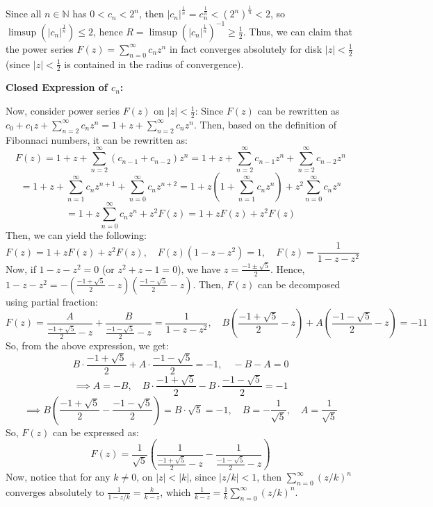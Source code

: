\documentclass{article}
\begin{document}
Since all $n\in\mathbb{N}$ has $0<c_n<2^n$, then $|c_n|^{\frac{1}{n}}=c_n^{\frac{1}{n}}<(2^n)^{\frac{1}{n}}<2$, so $\limsup(|c_n|^{\frac{1}{n}})\leq 2$, hence $R=\limsup(|c_n|^{\frac{1}{n}})^{-1}\geq\frac{1}{2}$.
Thus, we can claim that the power series $F(z)=\sum_{n=0}^{\infty}c_nz^n$ in fact converges absolutely for disk $|z|<\frac{1}{2}$ (since $|z|<\frac{1}{2}$ is contained in the radius of convergence).

\hfil

\textbf{Closed Expression of $c_n$:}

Now, consider power series $F(z)$ on $|z|<\frac{1}{2}$: Since $F(z)$ can be rewritten as $c_0+c_1z+\sum_{n=2}^{\infty}c_nz^n = 1+z+\sum_{n=2}^{\infty}c_nz^n$.
Then, based on the definition of Fibonnaci numbers, it can be rewritten as:
$$F(z)=1+z+\sum_{n=2}^{\infty}(c_{n-1}+c_{n-2})z^n = 1+z+\sum_{n=2}^{\infty}c_{n-1}z^n+\sum_{n=2}^{\infty}c_{n-2}z^n$$
$$ = 1+z+\sum_{n=1}^{\infty}c_nz^{n+1}+\sum_{n=0}^{\infty}c_nz^{n+2} = 1+z\left(1+\sum_{n=1}^{\infty}c_nz^n\right)+z^2\sum_{n=0}^{\infty}c_nz^n$$
$$=1+z\sum_{n=0}^{\infty}c_nz^n+z^2F(z) = 1+zF(z)+z^2F(z)$$
Then, we can yield the following:
$$F(z)=1+zF(z)+z^2F(z),\quad F(z)(1-z-z^2)=1,\quad F(z)=\frac{1}{1-z-z^2}$$
Now, if $1-z-z^2=0$ (or $z^2+z-1=0$), we have $z=\frac{-1\pm\sqrt{5}}{2}$. Hence, $1-z-z^2=-\left(\frac{-1+\sqrt{5}}{2}-z\right)\left(\frac{-1-\sqrt{5}}{2}-z\right)$.
Then, $F(z)$ can be decomposed using partial fraction:
$$F(z)=\frac{A}{\frac{-1+\sqrt{5}}{2}-z}+\frac{B}{\frac{-1-\sqrt{5}}{2}-z}=\frac{1}{1-z-z^2},\quad B\left(\frac{-1+\sqrt{5}}{2}-z\right)+A\left(\frac{-1-\sqrt{5}}{2}-z\right)=-11$$
So, from the above expression, we get:
$$B\cdot\frac{-1+\sqrt{5}}{2}+A\cdot \frac{-1-\sqrt{5}}{2}=-1,\quad -B-A=0$$
$$\implies A=-B,\quad B\cdot\frac{-1+\sqrt{5}}{2}-B\cdot \frac{-1-\sqrt{5}}{2}=-1$$
$$\implies B\left(\frac{-1+\sqrt{5}}{2}-\frac{-1-\sqrt{5}}{2}\right)=B\cdot \sqrt{5}=-1,\quad B=-\frac{1}{\sqrt{5}},\quad A=\frac{1}{\sqrt{5}}$$
So, $F(z)$ can be expressed as:
$$F(z)=\frac{1}{\sqrt{5}}\left(\frac{1}{\frac{-1+\sqrt{5}}{2}-z}-\frac{1}{\frac{-1-\sqrt{5}}{2}-z}\right)$$
Now, notice that for any $k\neq 0$, on $|z|<|k|$, since $|z/k|<1$, then $\sum_{n=0}^{\infty}(z/k)^n$ converges absolutely to $\frac{1}{1-z/k} = \frac{k}{k-z}$, which $\frac{1}{k-z}=\frac{1}{k}\sum_{n=0}^{\infty}(z/k)^n$.
\end{document}
